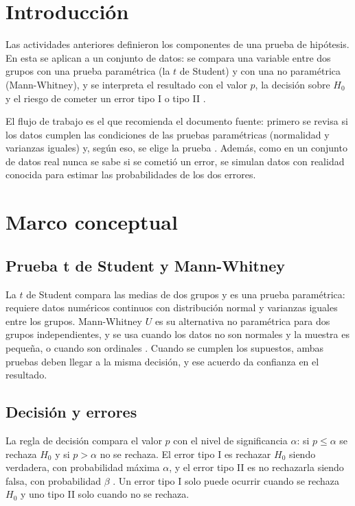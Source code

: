 \documentclass[11pt,letterpaper]{article}
\begin{document}
\portada
\indicegeneral


\section{Introducción}

Las actividades anteriores definieron los componentes de una prueba de hipótesis. En esta se aplican a un conjunto de datos: se compara una variable entre dos grupos con una prueba paramétrica (la $t$ de Student) y con una no paramétrica (Mann-Whitney), y se interpreta el resultado con el valor $p$, la decisión sobre $H_0$ y el riesgo de cometer un error tipo I o tipo II \parencite{tecnm2026_documento_fuente}.

El flujo de trabajo es el que recomienda el documento fuente: primero se revisa si los datos cumplen las condiciones de las pruebas paramétricas (normalidad y varianzas iguales) y, según eso, se elige la prueba \parencite{tecnm2026_documento_fuente}. Además, como en un conjunto de datos real nunca se sabe si se cometió un error, se simulan datos con realidad conocida para estimar las probabilidades de los dos errores.

\section{Marco conceptual}

\subsection{Prueba t de Student y Mann-Whitney}

La $t$ de Student compara las medias de dos grupos y es una prueba paramétrica: requiere datos numéricos continuos con distribución normal y varianzas iguales entre los grupos. Mann-Whitney $U$ es su alternativa no paramétrica para dos grupos independientes, y se usa cuando los datos no son normales y la muestra es pequeña, o cuando son ordinales \parencite{tecnm2026_documento_fuente}. Cuando se cumplen los supuestos, ambas pruebas deben llegar a la misma decisión, y ese acuerdo da confianza en el resultado.

\subsection{Decisión y errores}

La regla de decisión compara el valor $p$ con el nivel de significancia $\alpha$: si $p \le \alpha$ se rechaza $H_0$ y si $p > \alpha$ no se rechaza. El error tipo I es rechazar $H_0$ siendo verdadera, con probabilidad máxima $\alpha$, y el error tipo II es no rechazarla siendo falsa, con probabilidad $\beta$ \parencite{tecnm2026_documento_fuente}. Un error tipo I solo puede ocurrir cuando se rechaza $H_0$ y uno tipo II solo cuando no se rechaza.
\end{document}
